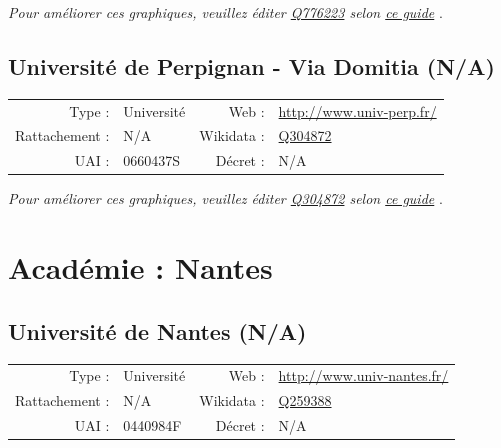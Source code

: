 \documentclass[11pt,french,landscape]{article}
\begin{document}
\textit{\scriptsize Pour améliorer ces graphiques, veuillez éditer \href{https://www.wikidata.org/entity/Q776223}{Q776223}  selon \href{https://github.com/cpesr/wikidataESR/blob/master/Rmd/wikidataESR.md}{ce guide}}
.


\newpage

\hypertarget{universituxe9-de-perpignan---via-domitia-na}{%
\subsection{Université de Perpignan - Via Domitia
(N/A)}\label{universituxe9-de-perpignan---via-domitia-na}}

\begin{tabular*}{0.45\textwidth}{rp{2cm}rl}  
\hline  
Type : & Université & Web : &\href{http://www.univ-perp.fr/}{http://www.univ-perp.fr/} \\  
Rattachement : & N/A & Wikidata : & \href{https://www.wikidata.org/entity/Q304872}{Q304872} \\  
UAI : & 0660437S & Décret : & N/A \\  
\hline  
\end{tabular*}

\textit{\scriptsize Pour améliorer ces graphiques, veuillez éditer \href{https://www.wikidata.org/entity/Q304872}{Q304872}  selon \href{https://github.com/cpesr/wikidataESR/blob/master/Rmd/wikidataESR.md}{ce guide}}
.


\newpage

\hypertarget{acaduxe9mie-nantes}{%
\section{Académie : Nantes}\label{acaduxe9mie-nantes}}

\hypertarget{universituxe9-de-nantes-na}{%
\subsection{Université de Nantes
(N/A)}\label{universituxe9-de-nantes-na}}

\begin{tabular*}{0.45\textwidth}{rp{2cm}rl}  
\hline  
Type : & Université & Web : &\href{http://www.univ-nantes.fr/}{http://www.univ-nantes.fr/} \\  
Rattachement : & N/A & Wikidata : & \href{https://www.wikidata.org/entity/Q259388}{Q259388} \\  
UAI : & 0440984F & Décret : & N/A \\  
\hline  
\end{tabular*}
\end{document}
